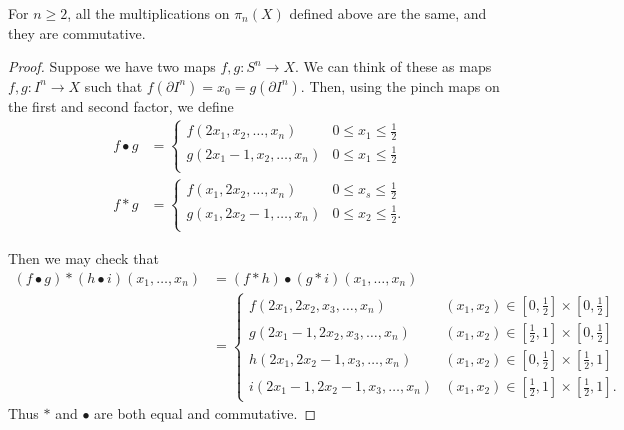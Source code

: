 \documentclass{article}[11pt]
\renewcommand{\dot}{\bullet }
\begin{document}
	\begin{corollary} For $n\geq 2$, all the multiplications on $\pi_n(X)$ defined above are the same, and they are commutative.
	\end{corollary}
	\begin{proof} Suppose we have two maps $f,g : S^n \to X$. We can think of these as maps $f,g: I^n \to X$ such that $f(\partial I^n) = x_0 = g(\partial I^n)$. Then, using the pinch maps on the first and second factor, we define
	\begin{align*}
		f\dot g &= \begin{cases} f(2x_1, x_2, \ldots, x_n) & 0 \leq x_1 \leq \frac{1}{2} \\ g(2x_1-1, x_2, \ldots,x_n) & 0 \leq x_1 \leq \frac{1}{2} \\ \end{cases} \\
		f\ast g &= \begin{cases} f(x_1, 2x_2, \ldots, x_n) & 0 \leq x_s \leq \frac{1}{2} \\ g(x_1,2x_2-1,\ldots,x_n) & 0 \leq x_2 \leq \frac{1}{2}. \\ \end{cases}
	\end{align*}

	Then we may check that
	\begin{align*}
		(f\dot g)\ast(h\dot i)(x_1,\ldots,x_n) &= (f\ast h)\dot (g\ast i)(x_1,\ldots,x_n) \\
		&= \begin{cases} f(2x_1,2x_2,x_3,\ldots,x_n) & (x_1,x_2) \in \left[0, \frac{1}{2} \right]\times\left[0, \frac{1}{2} \right] \\
		 g(2x_1-1,2x_2,x_3,\ldots,x_n) & (x_1,x_2) \in \left[ \frac{1}{2}, 1 \right]\times \left[0, \frac{1}{2} \right] \\
		 h(2x_1,2x_2-1,x_3,\ldots,x_n) & (x_1, x_2) \in \left[0, \frac{1}{2} \right]\times \left[ \frac{1}{2}, 1 \right] \\
		 i(2x_1 -1, 2x_2 -1, x_3,\ldots, x_n) & (x_1, x_2) \in \left[ \frac{1}{2}, 1 \right]\times \left[ \frac{1}{2}, 1 \right].
		 \end{cases}
	\end{align*}
	Thus $\ast$ and $\dot$ are both equal and commutative.

	\end{proof}
\end{document}
